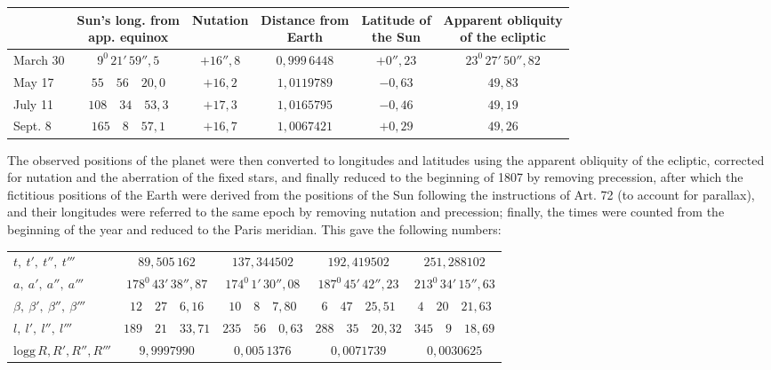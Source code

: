 \begin{center}
\begingroup\fontsize{9}{11}\selectfont\setlength{\tabcolsep}{2pt}
\begin{tabular}{|l|c|c|c|c|c|}
\hline
& \shortstack{Sun's long. from\\app. equinox} & Nutation & \shortstack{Distance from\\Earth} & \shortstack{Latitude of\\the Sun} & \shortstack{Apparent obliquity\\of the ecliptic}\\\hline
March 30 & $9^0\,21'\,59''{,}5$ & $+16''{,}8$ & $0{,}999\,6448$ & $+0''{,}23$ & $23^0\,27'\,50''{,}82$\\
May 17 & $55\quad56\quad20{,}0$ & $+16{,}2$ & $1{,}0119789$ & $-0{,}63$ & $49{,}83$\\
July 11 & $108\quad34\quad53{,}3$ & $+17{,}3$ & $1{,}0165795$ & $-0{,}46$ & $49{,}19$\\
Sept. 8 & $165\quad8\quad57{,}1$ & $+16{,}7$ & $1{,}0067421$ & $+0{,}29$ & $49{,}26$\\\hline
\end{tabular}\endgroup
\end{center}

The observed positions of the planet were then converted to longitudes and latitudes using the apparent obliquity of the ecliptic, corrected for nutation and the aberration of the fixed stars, and finally reduced to the beginning of 1807 by removing precession, after which the fictitious positions of the Earth were derived from the positions of the Sun following the instructions of Art. 72 (to account for parallax), and their longitudes were referred to the same epoch by removing nutation and precession; finally, the times were counted from the beginning of the year and reduced to the Paris meridian. This gave the following numbers:
\begin{center}
\begingroup\fontsize{9}{11}\selectfont\setlength{\tabcolsep}{2.5pt}
\begin{tabular}{l|c|c|c|c}
$t,\ t',\ t'',\ t'''$ & $89{,}505\,162$ & $137{,}344502$ & $192{,}419502$ & $251{,}288102$\\
$a,\ a',\ a'',\ a'''$ & $178^0\,43'\,38''{,}87$ & $174^0\,1'\,30''{,}08$ & $187^0\,45'\,42''{,}23$ & $213^0\,34'\,15''{,}63$\\
$\beta,\ \beta',\ \beta'',\ \beta'''$ & $12\quad27\quad6{,}16$ & $10\quad8\quad7{,}80$ & $6\quad47\quad25{,}51$ & $4\quad20\quad21{,}63$\\
$l,\ l',\ l'',\ l'''$ & $189\quad21\quad33{,}71$ & $235\quad56\quad0{,}63$ & $288\quad35\quad20{,}32$ & $345\quad9\quad18{,}69$\\
$\mathrm{logg}\,R,R',R'',R'''$ & $9{,}9997990$ & $0{,}005\,1376$ & $0{,}0071739$ & $0{,}0030625$
\end{tabular}\endgroup
\end{center}

